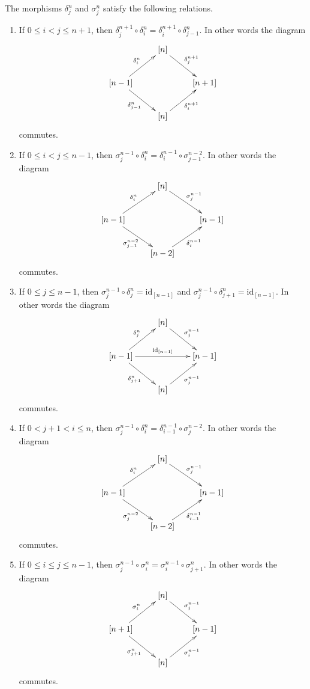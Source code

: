 \begin{lemma}
\label{lemma-relations-face-degeneracy}
The morphisms $\delta^n_j$ and $\sigma^n_j$ satisfy the following relations.
\begin{enumerate}
\item If $0 \leq i < j \leq n + 1$, then
$\delta^{n + 1}_j \circ \delta^n_i =
\delta^{n + 1}_i \circ \delta^n_{j - 1}$.
In other words the diagram
$$
\xymatrix{
& [n] \ar[rd]^{\delta^{n + 1}_j} & \\
[n - 1] \ar[ru]^{\delta^n_i} \ar[rd]_{\delta^n_{j - 1}} & &
[n + 1] \\
& [n] \ar[ru]_{\delta^{n + 1}_i} &
}
$$
commutes.
\item If $0 \leq i < j \leq n - 1$, then
$\sigma^{n - 1}_j \circ \delta^n_i =
\delta^{n - 1}_i \circ \sigma^{n - 2}_{j - 1}$.
In other words the diagram
$$
\xymatrix{
& [n] \ar[rd]^{\sigma^{n - 1}_j} & \\
[n - 1] \ar[ru]^{\delta^n_i} \ar[rd]_{\sigma^{n - 2}_{j - 1}} & &
[n - 1] \\
& [n - 2] \ar[ru]_{\delta^{n - 1}_i} &
}
$$
commutes.
\item If $0 \leq j \leq n - 1$, then
$\sigma^{n - 1}_j \circ \delta^n_j = \text{id}_{[n - 1]}$
and
$\sigma^{n - 1}_j \circ \delta^n_{j + 1} = \text{id}_{[n - 1]}$.
In other words the diagram
$$
\xymatrix{
& [n] \ar[rd]^{\sigma^{n - 1}_j} & \\
[n - 1]
\ar[ru]^{\delta^n_j}
\ar[rd]_{\delta^n_{j + 1}}
\ar[rr]^{\text{id}_{[n - 1]}} & & [n - 1] \\
& [n] \ar[ru]_{\sigma^{n - 1}_j} &
}
$$
commutes.
\item If $0 < j + 1 < i \leq n$, then
$\sigma^{n - 1}_j \circ \delta^n_i =
\delta^{n - 1}_{i - 1} \circ \sigma^{n - 2}_j$.
In other words the diagram
$$
\xymatrix{
& [n] \ar[rd]^{\sigma^{n - 1}_j} & \\
[n - 1] \ar[ru]^{\delta^n_i} \ar[rd]_{\sigma^{n - 2}_j} & &
[n - 1] \\
& [n - 2] \ar[ru]_{\delta^{n - 1}_{i - 1}} &
}
$$
commutes.
\item If $0 \leq i \leq j \leq n - 1$, then
$\sigma^{n - 1}_j \circ \sigma^n_i =
\sigma^{n - 1}_i \circ \sigma^n_{j + 1}$.
In other words the diagram
$$
\xymatrix{
& [n] \ar[rd]^{\sigma^{n - 1}_j} & \\
[n + 1] \ar[ru]^{\sigma^n_i} \ar[rd]_{\sigma^n_{j + 1}} & &
[n - 1] \\
& [n] \ar[ru]_{\sigma^{n - 1}_i} &
}
$$
commutes.
\end{enumerate}
\end{lemma}

